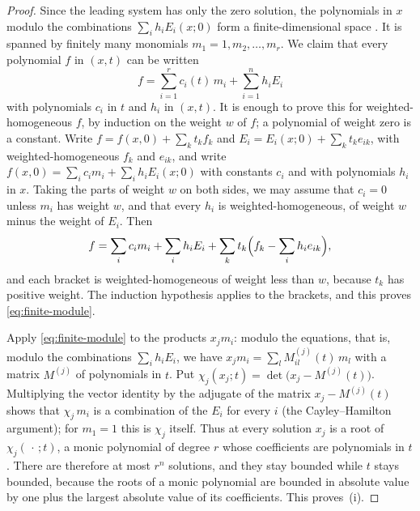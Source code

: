 \documentclass[11pt]{article}
\numberwithin{equation}{section}
\begin{document}
\begin{proof}
Since the leading system has only the zero solution, the polynomials
in \(x\) modulo the combinations \(\sum_ih_iE_i(x;0)\) form a
finite-dimensional space \citep[Chapter~5, \S3]{CoxLittleOSheaIVA}. It
is spanned by finitely many monomials \(m_1=1,m_2,\ldots,m_r\). We
claim that every polynomial \(f\) in \((x,t)\) can be written
\begin{equation}\label{eq:finite-module}
 f=\sum_{i=1}^{r}c_i(t)\,m_i+\sum_{i=1}^{n}h_iE_i
\end{equation}
with polynomials \(c_i\) in \(t\) and \(h_i\) in \((x,t)\). It is
enough to prove this for weighted-homogeneous \(f\), by induction on
the weight \(w\) of \(f\); a polynomial of weight zero is a constant.
Write \(f=f(x,0)+\sum_kt_kf_k\) and \(E_i=E_i(x;0)+\sum_kt_ke_{ik}\),
with weighted-homogeneous \(f_k\) and \(e_{ik}\), and write
\(f(x,0)=\sum_ic_im_i+\sum_ih_iE_i(x;0)\) with constants \(c_i\) and
with polynomials \(h_i\) in \(x\). Taking the parts of weight \(w\) on
both sides, we may assume that \(c_i=0\) unless \(m_i\) has weight
\(w\), and that every \(h_i\) is weighted-homogeneous, of weight \(w\)
minus the weight of \(E_i\). Then
\[
 f=\sum_ic_im_i+\sum_ih_iE_i
   +\sum_kt_k\Bigl(f_k-\sum_ih_ie_{ik}\Bigr),
\]
and each bracket is weighted-homogeneous of weight less than \(w\),
because \(t_k\) has positive weight. The induction hypothesis applies
to the brackets, and this proves \eqref{eq:finite-module}.

Apply \eqref{eq:finite-module} to the products \(x_jm_i\): modulo the
equations, that is, modulo the combinations \(\sum_ih_iE_i\), we have
\(x_jm_i=\sum_lM^{(j)}_{il}(t)\,m_l\) with a matrix \(M^{(j)}\) of
polynomials in \(t\). Put
\(\chi_j(x_j;t)=\det\bigl(x_j-M^{(j)}(t)\bigr)\). Multiplying the vector
identity by the adjugate of the matrix \(x_j-M^{(j)}(t)\) shows that
\(\chi_j\,m_i\) is a combination of the \(E_i\) for every \(i\) (the
Cayley--Hamilton argument); for \(m_1=1\) this is \(\chi_j\) itself.
Thus at every solution \(x_j\) is a root of \(\chi_j(\,\cdot\,;t)\), a
monic polynomial of degree \(r\) whose coefficients are polynomials in
\(t\). There are therefore at most \(r^n\) solutions, and they stay
bounded while \(t\) stays bounded, because the roots of a monic
polynomial are bounded in absolute value by one plus the largest
absolute value of its coefficients. This proves~(i).


\end{proof}
\end{document}
